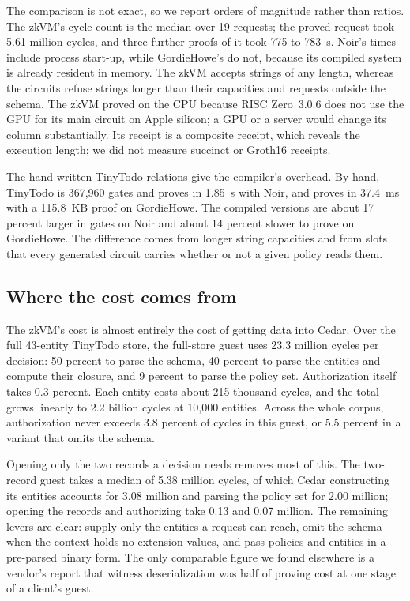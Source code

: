 \documentclass[11pt]{article}
\begin{document}
The comparison is not exact, so we report orders of magnitude rather than ratios. The zkVM's cycle count is the median over 19 requests; the proved request took 5.61 million cycles, and three further proofs of it took 775 to 783~s. Noir's times include process start-up, while GordieHowe's do not, because its compiled system is already resident in memory. The zkVM accepts strings of any length, whereas the circuits refuse strings longer than their capacities and requests outside the schema. The zkVM proved on the CPU because RISC Zero~3.0.6 does not use the GPU for its main circuit on Apple silicon; a GPU or a server would change its column substantially. Its receipt is a composite receipt, which reveals the execution length; we did not measure succinct or Groth16 receipts.

The hand-written TinyTodo relations give the compiler's overhead. By hand, TinyTodo is 367,960 gates and proves in 1.85~s with Noir, and proves in 37.4~ms with a 115.8~KB proof on GordieHowe. The compiled versions are about 17 percent larger in gates on Noir and about 14 percent slower to prove on GordieHowe. The difference comes from longer string capacities and from slots that every generated circuit carries whether or not a given policy reads them.

\subsection{Where the cost comes from}
\label{sec:where}

The zkVM's cost is almost entirely the cost of getting data into Cedar. Over the full 43-entity TinyTodo store, the full-store guest uses 23.3 million cycles per decision: 50 percent to parse the schema, 40 percent to parse the entities and compute their closure, and 9 percent to parse the policy set. Authorization itself takes 0.3 percent. Each entity costs about 215 thousand cycles, and the total grows linearly to 2.2 billion cycles at 10,000 entities. Across the whole corpus, authorization never exceeds 3.8 percent of cycles in this guest, or 5.5 percent in a variant that omits the schema.

Opening only the two records a decision needs removes most of this. The two-record guest takes a median of 5.38 million cycles, of which Cedar constructing its entities accounts for 3.08 million and parsing the policy set for 2.00 million; opening the records and authorizing take 0.13 and 0.07 million. The remaining levers are clear: supply only the entities a request can reach, omit the schema when the context holds no extension values, and pass policies and entities in a pre-parsed binary form. The only comparable figure we found elsewhere is a vendor's report that witness deserialization was half of proving cost at one stage of a client's guest.
\end{document}
